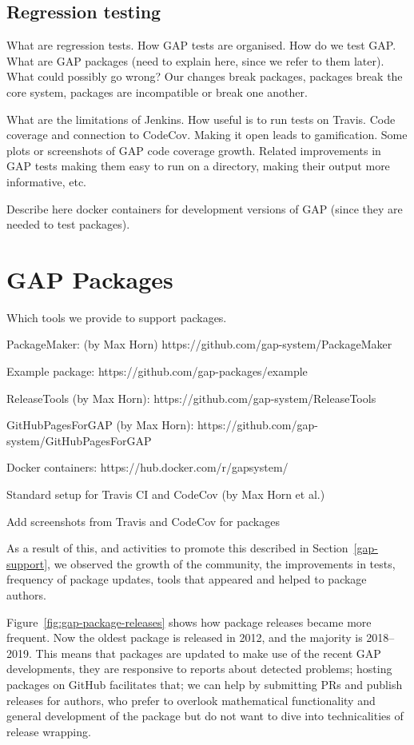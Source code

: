 \documentclass{deliverablereport}
\begin{document}
\subsection{Regression testing}\label{testing}

What are regression tests.
How GAP tests are organised.
How do we test GAP.
What are GAP packages (need to explain here, since we refer to them later).
What could possibly go wrong? Our changes
break packages, packages break the core
system, packages are incompatible or break one another.

What are the limitations of Jenkins.
How useful is to run tests on Travis.
Code coverage and connection to CodeCov.
Making it open leads to gamification.
Some plots or screenshots of GAP code coverage growth.
Related improvements in GAP tests making them
easy to run on a directory, making their output 
more informative, etc.

Describe here docker containers for development 
versions of GAP (since they are needed to test
packages).

\section{GAP Packages}\label{packages}

Which tools we provide to support packages.

PackageMaker: (by Max Horn) https://github.com/gap-system/PackageMaker 

Example package: https://github.com/gap-packages/example 

ReleaseTools (by Max Horn): https://github.com/gap-system/ReleaseTools 

GitHubPagesForGAP (by Max Horn): https://github.com/gap-system/GitHubPagesForGAP 

Docker containers: https://hub.docker.com/r/gapsystem/ 

Standard setup for Travis CI and CodeCov (by Max Horn et al.)

Add screenshots from Travis and CodeCov for packages

As a result of this, and activities to promote this described in Section~\ref{gap-support},
we observed the growth of the community, the improvements in tests, frequency
of package updates, tools that appeared and helped to package authors. 

Figure~\ref{fig:gap-package-releases} shows how package releases became more frequent.
Now the oldest package is released in 2012, and the majority is 2018--2019. 
This means that packages are updated to make use of the recent GAP developments,
they are responsive to reports about detected problems; hosting packages on GitHub
facilitates that; we can help by submitting PRs and publish releases for authors,
who prefer to overlook mathematical functionality and general development of the
package but do not want to dive into technicalities of release wrapping.
\end{document}
